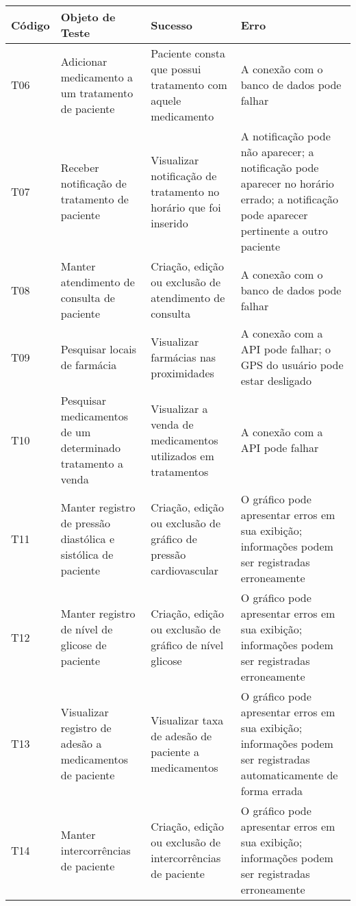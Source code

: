 \begin{quadro}[!htbp]
    \small
    \begin{tabular}{|l|p{4cm}|p{5cm}|p{5cm}|}
        \hline
        \textbf{Código} & \textbf{Objeto de Teste} & \textbf{Sucesso} & \textbf{Erro} \\ \hline
        T06 & Adicionar medicamento a um tratamento de paciente & Paciente consta que possui tratamento com aquele medicamento & A conexão com o banco de dados pode falhar \\ \hline
        T07 & Receber notificação de tratamento de paciente & Visualizar notificação de tratamento no horário que foi inserido & A notificação pode não aparecer; a notificação pode aparecer no horário errado; a notificação pode aparecer pertinente a outro paciente \\ \hline
        T08 & Manter atendimento de consulta de paciente & Criação, edição ou exclusão de atendimento de consulta & A conexão com o banco de dados pode falhar \\ \hline
        T09 & Pesquisar locais de farmácia & Visualizar farmácias nas proximidades & A conexão com a API pode falhar; o GPS do usuário pode estar desligado \\ \hline
        T10 & Pesquisar medicamentos de um determinado tratamento a venda & Visualizar a venda de medicamentos utilizados em tratamentos & A conexão com a API pode falhar \\ \hline
        T11 & Manter registro de pressão diastólica e sistólica de paciente & Criação, edição ou exclusão de gráfico de pressão cardiovascular & O gráfico pode apresentar erros em sua exibição; informações podem ser registradas erroneamente \\ \hline
        T12 & Manter registro de nível de glicose de paciente & Criação, edição ou exclusão de gráfico de nível glicose & O gráfico pode apresentar erros em sua exibição; informações podem ser registradas erroneamente \\ \hline
        T13 & Visualizar registro de adesão a medicamentos de paciente & Visualizar taxa de adesão de paciente a medicamentos & O gráfico pode apresentar erros em sua exibição; informações podem ser registradas automaticamente de forma errada \\ \hline
        T14 & Manter intercorrências de paciente & Criação, edição ou exclusão de intercorrências de paciente & O gráfico pode apresentar erros em sua exibição; informações podem ser registradas erroneamente \\ \hline
    \end{tabular}
\end{quadro}
